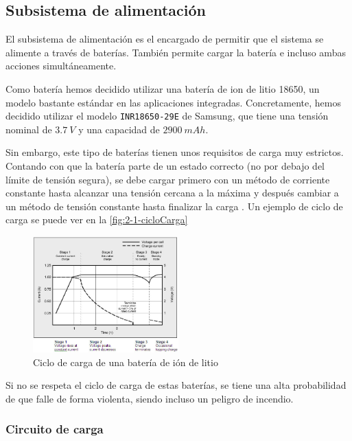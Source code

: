 \subsection{Subsistema de alimentación}

El subsistema de alimentación es el encargado de permitir que el sistema se alimente a través de baterías. También permite cargar la batería e incluso ambas acciones simultáneamente.

Como batería hemos decidido utilizar una batería de ion de litio 18650, un modelo bastante estándar en las aplicaciones integradas.  Concretamente, hemos decidido utilizar el modelo \texttt{INR18650-29E} de Samsung, que tiene una tensión nominal de $3.7\ V$ y una capacidad de $2900\ mAh$.

Sin embargo, este tipo de baterías tienen unos requisitos de carga muy estrictos. Contando con que la batería parte de un estado correcto (no por debajo del límite de tensión segura), se debe cargar primero con un método de corriente constante hasta alcanzar una tensión cercana a la máxima y después cambiar a un método de tensión constante hasta finalizar la carga \cite{BU409ChargingLithiumion}. Un ejemplo de ciclo de carga se puede ver en la \autoref{fig:2-1-cicloCarga}

\begin{figure}[h]
    \centering
    \includegraphics[width=0.5\textwidth]{images/2/2-1/cargaBateria.png}
    \caption{Ciclo de carga de una batería de ión de litio}
    \label{fig:2-1-cicloCarga}
\end{figure}

Si no se respeta el ciclo de carga de estas baterías, se tiene una alta probabilidad de que falle de forma violenta, siendo incluso un peligro de incendio. 

\subsubsection{Circuito de carga}

